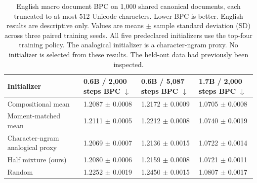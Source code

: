 \begin{table}[t]
\centering
\small
\setlength{\tabcolsep}{4pt}
\begin{tabular}{@{}llll@{}}
\toprule
Initializer & \shortstack{0.6B / 2,000 steps\\BPC $\downarrow$} & \shortstack{0.6B / 5,087 steps\\BPC $\downarrow$} & \shortstack{1.7B / 2,000 steps\\BPC $\downarrow$} \\
\midrule
Compositional mean & 1.2087 $\pm$ 0.0008 & 1.2172 $\pm$ 0.0009 & 1.0705 $\pm$ 0.0008 \\
Moment-matched mean & 1.2111 $\pm$ 0.0005 & 1.2212 $\pm$ 0.0008 & 1.0740 $\pm$ 0.0019 \\
Character-ngram analogical proxy & 1.2069 $\pm$ 0.0007 & 1.2136 $\pm$ 0.0015 & 1.0722 $\pm$ 0.0014 \\
Half mixture (ours) & 1.2080 $\pm$ 0.0006 & 1.2159 $\pm$ 0.0008 & 1.0721 $\pm$ 0.0011 \\
Random & 1.2252 $\pm$ 0.0019 & 1.2450 $\pm$ 0.0015 & 1.0807 $\pm$ 0.0017 \\
\bottomrule
\end{tabular}
\caption{English macro document BPC on 1,000 shared canonical documents, each truncated to at most 512 Unicode characters. Lower BPC is better. English results are descriptive only. Values are means $\pm$ sample standard deviation (SD) across three paired training seeds. All five predeclared initializers use the top-four training policy. The analogical initializer is a character-ngram proxy. No initializer is selected from these results. The held-out data had previously been inspected. }
\label{tab:rebuttal-initializer-en}
\end{table}
